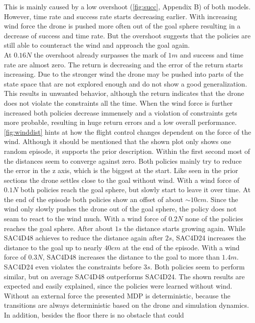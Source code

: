 This is mainly caused by a low overshoot (\cref{fig:succ}, Appendix B) of both models.
However, time rate and success rate starts decreasing earlier. With increasing wind force 
the drone is pushed more often out of the goal sphere resulting in a decrease of success and time rate.
But the overshoot suggests that the policies are still able to counteract the wind and approach the 
goal again.\\
At $0.16N$ the overshoot already surpasses the mark of $1m$ and success and time rate are almost zero.
The return is decreasing and the error of the return starts increasing. Due to the stronger wind
the drone may be pushed into parts of the state space that are not explored enough
and do not show a good generalization. This results in unwanted behavior, although the 
return indicates that the drone does not violate the constraints all the time.
When the wind force is further increased both policies decrease immensely and a violation of 
constraints gets more probable, resulting in huge return errors and a low overall performance.
\cref{fig:winddist} hints at how the flight control changes dependent on the force of the wind.
Although it should be mentioned that the shown plot only shows one random episode, it supports the prior
description. Within the first second most of the distances seem to converge against zero.
Both policies mainly try to reduce the error in the z axis, which is the biggest at the start.
Like seen in the prior sections the drone settles close to the goal without wind.
With a wind force of $0.1N$ both policies reach the goal sphere, but slowly start to leave it over time.
At the end of the episode both policies show an offset of about $\sim 10cm$.
Since the wind only slowly pushes the drone out of the goal sphere, the policy does not seam to 
react to the wind much.
With a wind force of $0.2N$ none of the policies reaches the goal sphere. After about $1s$ the distance
starts growing again. While SAC4D48 achieves to reduce the distance again after $2s$, SAC4D24 increases
the distance to the goal up to nearly $40cm$ at the end of the episode.
With a wind force of $0.3N$, SAC4D48 increases the distance to the goal to more than $1.4m$.
SAC4D24 even violates the constraints before $3s$.
Both policies seem to perform similar, but on average SAC4D48 outperforms SAC4D24.
The shown results are expected and easily explained, since the policies were learned without wind.
Without an external force the presented MDP is deterministic, because the transitions are always deterministic based
on the drone and simulation dynamics. In addition, besides the floor there is no obstacle that could 
